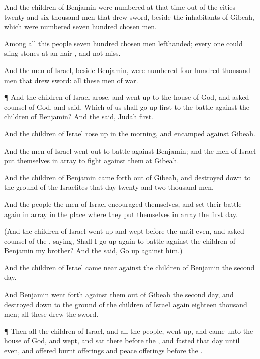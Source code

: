 {And the
children of
Benjamin were
numbered at that
time out of the
cities
twenty and
six
thousand
men that
drew
sword, beside the
inhabitants of
Gibeah, which were
numbered
seven
hundred
chosen
men.

Among all this
people
{}
seven
hundred
chosen
men
lefthanded; every one could
sling
stones at an
hair
{}, and not
miss.

And the
men of
Israel, beside
Benjamin, were
numbered
four
hundred
thousand
men that
drew
sword: all these
{}
men of
war.


\par }{\PP {}¶ And the
children of
Israel
arose, and went
up to the
house of
God, and
asked counsel of
God, and
said,
Which of us shall go
up
first to the
battle against the
children of
Benjamin? And the
{}
said,
Judah
{}
first.

And the
children of
Israel rose
up in the
morning, and
encamped against
Gibeah.

And the
men of
Israel went
out to
battle against
Benjamin; and the
men of
Israel put themselves in
array to
fight against them at
Gibeah.

And the
children of
Benjamin came
forth out of
Gibeah, and destroyed
down to the
ground of the
Israelites that
day
twenty and
two
thousand
men.

And the
people the
men of
Israel
encouraged themselves, and set their
battle
again in
array in the
place where they put themselves in
array the
first
day.

(And the
children of
Israel went
up and
wept
before the
{} until
even, and
asked counsel of the
{},
saying, Shall I go
up
again to
battle against the
children of
Benjamin my
brother? And the
{}
said, Go
up against him.)

And the
children of
Israel came
near against the
children of
Benjamin the
second
day.

And
Benjamin went
forth
against them out of
Gibeah the
second
day, and destroyed
down to the
ground of the
children of
Israel again
eighteen
thousand
men; all these
drew the
sword.


\par }{\PP {}¶ Then all the
children of
Israel, and all the
people, went
up, and
came unto the
house of
God, and
wept, and
sat there
before the
{}, and
fasted that
day until
even, and
offered burnt
offerings and peace
offerings
before the
{}.

}
